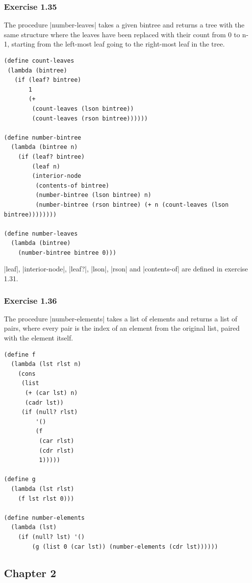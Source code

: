 \documentclass[a4paper]{article}
\begin{document}
\subsubsection{Exercise 1.35}

The procedure |number-leaves| takes a given bintree and returns a tree with the same structure where the leaves have been replaced with their count from 0 to n-1, starting from the left-most leaf going to the right-most leaf in the tree.

\begin{lstlisting}
(define count-leaves
 (lambda (bintree)
   (if (leaf? bintree)
       1
       (+
        (count-leaves (lson bintree))
        (count-leaves (rson bintree))))))

(define number-bintree
  (lambda (bintree n)
    (if (leaf? bintree)
        (leaf n)
        (interior-node
         (contents-of bintree)
         (number-bintree (lson bintree) n)
         (number-bintree (rson bintree) (+ n (count-leaves (lson bintree))))))))

(define number-leaves
  (lambda (bintree)
    (number-bintree bintree 0)))
\end{lstlisting}

|leaf|, |interior-node|, |leaf?|, |lson|, |rson| and |contents-of| are defined in exercise 1.31.

\subsubsection{Exercise 1.36}

The procedure |number-elements| takes a list of elements and returns a list of pairs, where every pair is the index of an element from the original list, paired with the element itself.

\begin{lstlisting}
(define f
  (lambda (lst rlst n)
    (cons
     (list
      (+ (car lst) n)
      (cadr lst))
     (if (null? rlst)
         '()
         (f
          (car rlst)
          (cdr rlst)
          1)))))

(define g
  (lambda (lst rlst)
    (f lst rlst 0)))

(define number-elements
  (lambda (lst)
    (if (null? lst) '()
        (g (list 0 (car lst)) (number-elements (cdr lst))))))
\end{lstlisting}

\newpage

\subsection{Chapter 2}
\end{document}
